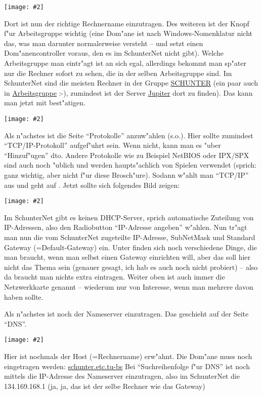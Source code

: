 \documentclass[12pt,titlepage,twoside]{scrartcl}
\newcommand{\centergraphics}[2][]{
\begin{center}
\texttt{[image: \#2]}
\end{center}
}
\begin{document}
\centergraphics{Identifikation}

Dort ist nun der richtige Rechnername einzutragen. Des weiteren ist der
Knopf f"ur Arbeitsgruppe wichtig (eine Dom"ane ist nach Windows-Nomenklatur
nicht das, was man darunter normalerweise versteht -- und setzt einen
Dom"anencontroller voraus, den es im SchunterNet nicht gibt). Welche
Arbeitsgruppe man eintr"agt ist an sich egal, allerdings bekommt man sp"ater
nur die Rechner sofort zu sehen, die in der selben Arbeitsgruppe sind. Im
SchunterNet sind die meisten Rechner in der Gruppe \url{SCHUNTER} (ein paar
auch in \url{Arbeitsgruppe} :-), zumindest ist der Server \url{Jupiter} dort zu
finden). Das kann man jetzt mit  best"atigen.

\centergraphics{protokolle}

Als n"achstes ist die Seite "`Protokolle"' anzuw"ahlen (s.o.). Hier sollte
zumindest "`TCP/IP-Protokoll"' aufgef"uhrt sein. Wenn nicht, kann man es "uber
"`Hinzuf"ugen"' dto. Andere Protokolle wie zu Beispiel NetBIOS oder IPX/SPX
sind auch noch "ublich und werden haupts"achlich von Spielen verwendet
(sprich: ganz wichtig, aber nicht f"ur diese Brosch"ure). Sodann w"ahlt man
"`TCP/IP"' aus und geht auf . Jetzt sollte sich
folgendes Bild zeigen:

\centergraphics{IPAdresse}

Im SchunterNet gibt es keinen DHCP-Server, sprich automatische Zuteilung
von IP-Adressen, also den Radiobutton "`IP-Adresse angeben"' w"ahlen.
Nun tr"agt man nun die vom SchunterNet zugeteilte IP-Adresse, SubNetMask
und Standard Gateway (=Default-Gateway) ein. Unter  finden
sich noch verschiedene Dinge, die man braucht, wenn man selbst einen Gateway
einrichten will, aber das soll hier nicht das Thema sein (genauer gesagt,
ich hab es auch noch nicht probiert) -- also da braucht man nichts extra
eintragen. Weiter oben ist auch immer die Netzwerkkarte genannt --
wiederum nur von Interesse, wenn man mehrere davon haben sollte.

Als n"achstes ist noch der Nameserver einzutragen. Das geschieht auf der
Seite "`DNS"'.

\centergraphics{DNS}

Hier ist nochmals der Host (=Rechnername) erw"ahnt. Die Dom"ane muss noch
eingetragen werden: \url{schunter.etc.tu-bs} Bei "`Suchreihenfolge f"ur DNS"'
ist noch mittels  die IP-Adresse des Nameserver
einzutragen, also im SchunterNet die 134.169.168.1 (ja, ja, das ist der selbe
Rechner wie das Gateway)
\end{document}
